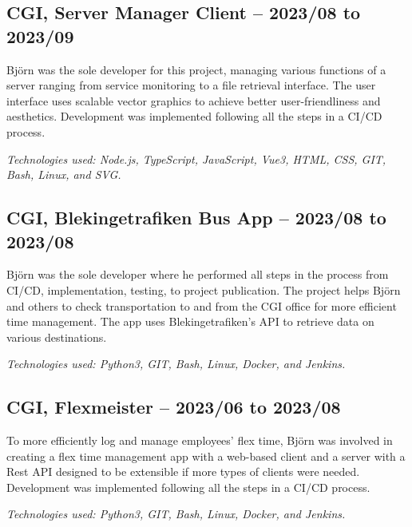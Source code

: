 \begin{minipage}[t]{0.9\textwidth}
	\subsection*{\textcolor{colorTitelErfarenhet}{CGI, Server Manager Client – 2023/08 to 2023/09}}
	Björn was the sole developer for this project, managing various functions of a server ranging from service monitoring to a file retrieval interface. The user interface uses scalable vector graphics to achieve better user-friendliness and aesthetics. Development was implemented following all the steps in a CI/CD process.
	
	\vspace{5pt}\textit{Technologies used: Node.js, TypeScript, JavaScript, Vue3, HTML, CSS, GIT, Bash, Linux, and SVG.}
	
	\vspace{15pt} %
	
\subsection*{\textcolor{colorTitelErfarenhet}{CGI, Blekingetrafiken Bus App – 2023/08 to 2023/08}}
Björn was the sole developer where he performed all steps in the process from CI/CD, implementation, testing, to project publication. The project helps Björn and others to check transportation to and from the CGI office for more efficient time management. The app uses Blekingetrafiken's API to retrieve data on various destinations.

\vspace{5pt}\textit{Technologies used: Python3, GIT, Bash, Linux, Docker, and Jenkins.}

\vspace{15pt} %

\subsection*{\textcolor{colorTitelErfarenhet}{CGI, Flexmeister – 2023/06 to 2023/08}}
To more efficiently log and manage employees' flex time, Björn was involved in creating a flex time management app with a web-based client and a server with a Rest API designed to be extensible if more types of clients were needed. Development was implemented following all the steps in a CI/CD process.

\vspace{5pt}\textit{Technologies used: Python3, GIT, Bash, Linux, Docker, and Jenkins.}


\end{minipage}

